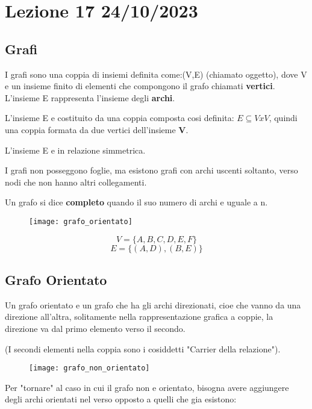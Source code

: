 \section{Lezione 17 24/10/2023}

\subsection{Grafi}
I grafi sono una coppia di insiemi definita come:(V,E) (chiamato oggetto), dove V e un insieme finito di elementi che compongono il grafo chiamati \textbf{vertici}. L'insieme E rappresenta l'insieme degli \textbf{archi}.

L'insieme E e costituito da una coppia composta cosi definita: $E \subseteq V x V$, quindi una coppia formata da due vertici dell'insieme \textbf{V}.

L'insieme E e in relazione simmetrica. 

I  grafi non posseggono foglie, ma esistono grafi con archi uscenti soltanto, verso nodi che non hanno altri collegamenti.

Un grafo si dice \textbf{completo} quando il suo numero di archi e uguale a n.

\begin{figure}[H]
	\begin{center}
		\texttt{[image: grafo\_orientato]}
	\end{center}
\end{figure}
$$ V = \{A,B,C,D,E,F\} $$
$$E = \{(A,D), (B,E)\}$$





\subsection{Grafo Orientato}
Un grafo orientato e un grafo che ha gli archi direzionati, cioe che vanno da una direzione all'altra, solitamente nella rappresentazione grafica a coppie, la direzione va dal primo elemento verso il secondo.

(I secondi elementi nella coppia sono i cosiddetti "Carrier della relazione").

\begin{figure}[H]
	\begin{center}
		\texttt{[image: grafo\_non\_orientato]}
	\end{center}
\end{figure}

Per "tornare" al caso in cui il grafo non e orientato, bisogna avere aggiungere degli archi orientati nel verso opposto a quelli che gia esistono:

